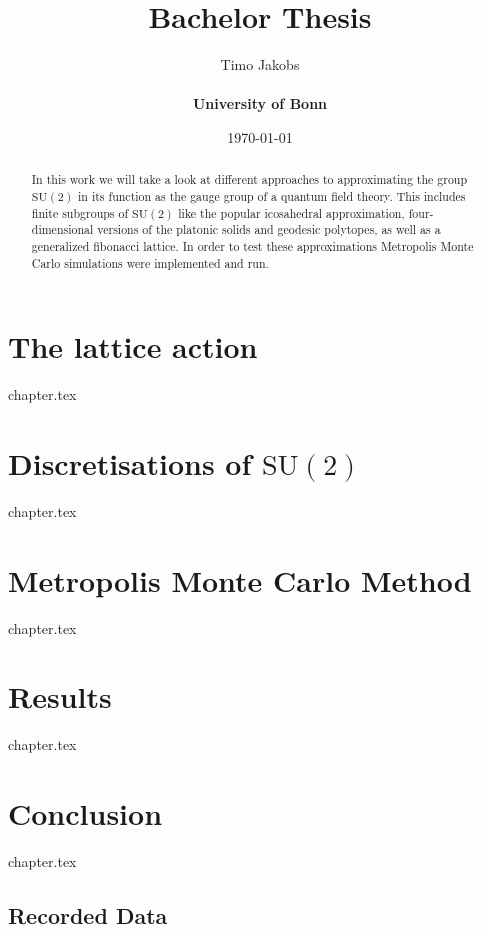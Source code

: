 \documentclass[a4paper]{scrartcl}
\title{Bachelor Thesis}
\author{Timo Jakobs \\\\ \textbf{University of Bonn}}
\date{\today}
\newcommand{\SUTwo}{$\mathrm{SU}(2)$\xspace}
\begin{document}
\maketitle

\begin{abstract}
In this work we will take a look at different approaches to approximating the group \SUTwo in its function as the gauge group of a quantum field theory. This includes finite subgroups of \SUTwo like the popular icosahedral approximation, four-dimensional versions of the platonic solids and geodesic polytopes, as well as a generalized fibonacci lattice. In order to test these approximations Metropolis Monte Carlo simulations were implemented and run.
\end{abstract}

\tableofcontents
\newpage




\section{The lattice action}
{chapter.tex}

\section{Discretisations of \SUTwo}
\label{sec:discSu2}
{chapter.tex}

\section{Metropolis Monte Carlo Method}
{chapter.tex}

\section{Results}
\label{sec:results}
{chapter.tex}

\section{Conclusion}
\label{sec:conclusion}
{chapter.tex}

\printbibliography

\begin{appendix}
\section{Recorded Data}
\end{appendix}
\end{document}
